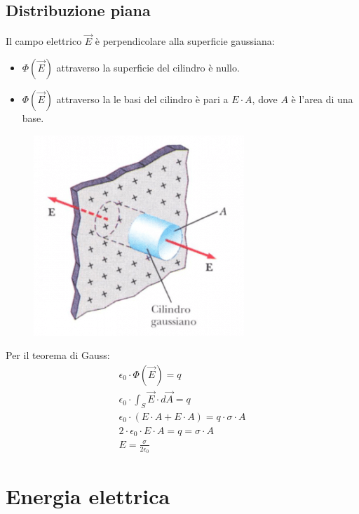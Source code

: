 \subsection{Distribuzione piana}
Il campo elettrico $\vec{E}$ è perpendicolare alla superficie gaussiana:
	\begin{itemize}
    	\item{$\Phi(\vec{E})$ attraverso la superficie del cilindro è nullo.}
        \item{$\Phi(\vec{E})$ attraverso la le basi del cilindro è pari a $E \cdot A$, dove $A$ è l'area di una base.}
    \end{itemize}

\begin{figure}[h!]
	\centering
	\includegraphics[scale=0.5]{Pictures/esempio4.png}
\end{figure}
Per il teorema di Gauss:
	\begin{displaymath}\begin{aligned}
		\epsilon_0 \cdot \Phi(\vec{E}) = q\\
        \epsilon_0 \cdot \int_S \vec{E} \cdot d\vec{A} = q\\
        \epsilon_0 \cdot (E\cdot A + E \cdot A) = q \cdot \sigma \cdot A\\
        2 \cdot \epsilon_0 \cdot E\cdot A = q = \sigma \cdot A\\
        E = \frac{\sigma}{2 \epsilon_0}
	\end{aligned}\end{displaymath}


\section{Energia elettrica}
